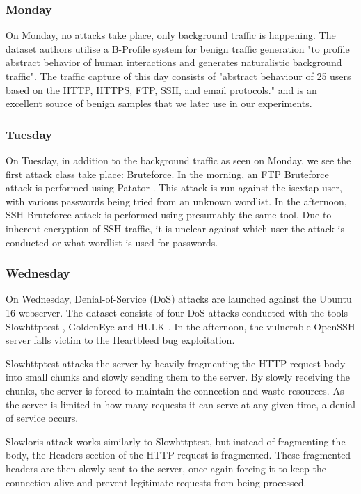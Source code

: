 \subsubsection{Monday}

On Monday, no attacks take place, only background traffic is happening. The dataset authors utilise a B-Profile system \cite{b_profile} for benign traffic generation "to profile abstract behavior of human interactions and generates naturalistic background traffic"\cite{cic_2017}. The traffic capture of this day consists of "abstract behaviour of 25 users based on the HTTP, HTTPS, FTP, SSH, and email protocols." \cite{cic_2017} and is an excellent source of benign samples that we later use in our experiments.

\subsubsection{Tuesday}
On Tuesday, in addition to the background traffic as seen on Monday, we see the first attack class take place: Bruteforce. In the morning, an FTP Bruteforce attack is performed using Patator \cite{patator}. This attack is run against the iscxtap user, with various passwords being tried from an unknown wordlist. In the afternoon, SSH Bruteforce attack is performed using presumably the same tool. Due to inherent encryption of SSH traffic, it is unclear against which user the attack is conducted or what wordlist is used for passwords.

\subsubsection{Wednesday}
On Wednesday, Denial-of-Service (DoS) attacks are launched against the Ubuntu 16 webserver. The dataset consists of four DoS attacks conducted with the tools Slowhttptest \cite{slowhttptest}, GoldenEye \cite{goldeneye} and HULK \cite{hulk}. In the afternoon, the vulnerable OpenSSH server falls victim to the Heartbleed bug \cite{heartbleed} exploitation.  

Slowhttptest attacks the server by heavily fragmenting the HTTP request body into small chunks and slowly sending them to the server. By slowly receiving the chunks, the server is forced to maintain the connection and waste resources. As the server is limited in how many requests it can serve at any given time, a denial of service occurs.

Slowloris attack works similarly to Slowhttptest, but instead of fragmenting the body, the Headers section of the HTTP request is fragmented. These fragmented headers are then slowly sent to the server, once again forcing it to keep the connection alive and prevent legitimate requests from being processed.

